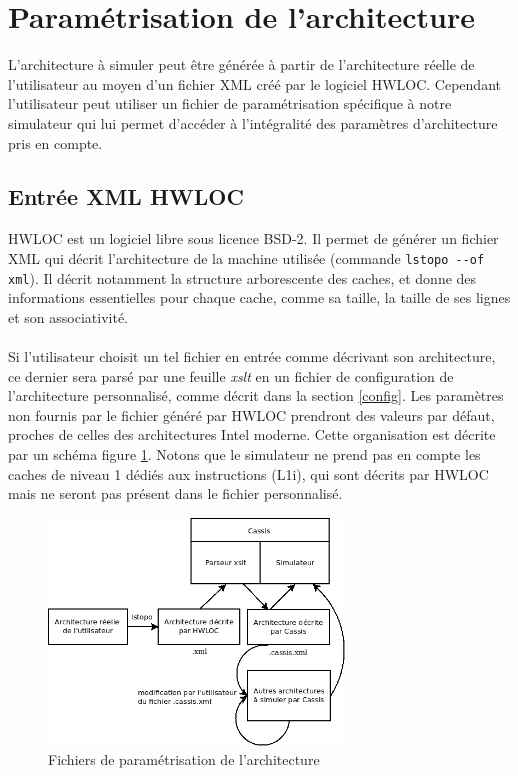 \section{Paramétrisation de l'architecture}

\label{param_xml}
L'architecture à simuler peut être générée à partir de l'architecture réelle de l'utilisateur au moyen d'un fichier XML créé par le logiciel \textsf{HWLOC}. Cependant l'utilisateur peut utiliser un fichier de paramétrisation spécifique à notre simulateur qui lui permet d'accéder à l'intégralité des paramètres d'architecture pris en compte.

\subsection{Entrée XML HWLOC}

\textsf{HWLOC} est un logiciel libre sous licence BSD-2. Il permet de générer un fichier XML qui décrit l'architecture de la machine utilisée (commande \verb?lstopo --of xml?). Il décrit notamment la structure arborescente des caches, et donne des informations essentielles pour chaque cache, comme sa taille, la taille de ses lignes et son associativité. 

\paragraph{}
Si l'utilisateur choisit un tel fichier en entrée comme décrivant son architecture, ce dernier sera parsé par une feuille \textit{xslt} en un fichier de configuration de l'architecture personnalisé, comme décrit dans la section \ref{config}. Les paramètres non fournis par le fichier généré par \textsf{HWLOC} prendront des valeurs par défaut, proches de celles des architectures \textsf{Intel} moderne. Cette organisation est décrite par un schéma figure \ref{img:archi}. Notons que le simulateur ne prend pas en compte les caches de niveau 1 dédiés aux instructions (L1i), qui sont décrits par \textsf{HWLOC} mais ne seront pas présent dans le fichier personnalisé.

\begin{figure}[!h]
\begin{center}
   \includegraphics[width=0.7\textwidth]{images/schema_archi.png}
   \caption{\label{img:archi} Fichiers de paramétrisation de l'architecture}
\end{center}
\end{figure}


